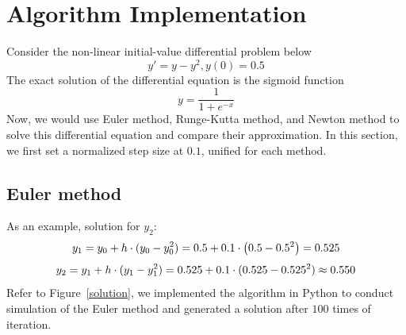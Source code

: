 \documentclass[
11pt, %
a4paper, %
oneside, %
headinclude,footinclude, %
BCOR5mm, %
]{scrartcl}
\begin{document}
\section{Algorithm Implementation}
Consider the non-linear initial-value differential problem below
\begin{equation}
    y' = y - y^2, y(0) = 0.5 \tag{3.1}
\end{equation}
The exact solution of the differential equation is the sigmoid function
\begin{equation}
    y = \frac{1}{1+e^{-x}} \tag{3.2}
\end{equation}
Now, we would use Euler method, Runge-Kutta method, and Newton method to solve this differential equation and compare their approximation. In this section, we first set a normalized step size at $0.1$, unified for each method.
\subsection{Euler method}
As an example, solution for $y_2$: \\
\begin{equation}
    y_{1} = y_{0} + h\cdot (y_{0} - y_{0}^2) = 0.5 +0.1\cdot \left(0.5- 0.5^2\right) = 0.525 \notag
\end{equation}
\begin{equation}
    y_{2}= y_{1} + h\cdot (y_{1} - y_{1}^2) = 0.525+0.1\cdot (0.525 - 0.525^2) \approx 0.550 \notag
\end{equation}
Refer to Figure~\vref{solution}, we implemented the algorithm in Python to conduct simulation of the Euler method and generated a solution after $100$ times of iteration.
\end{document}

